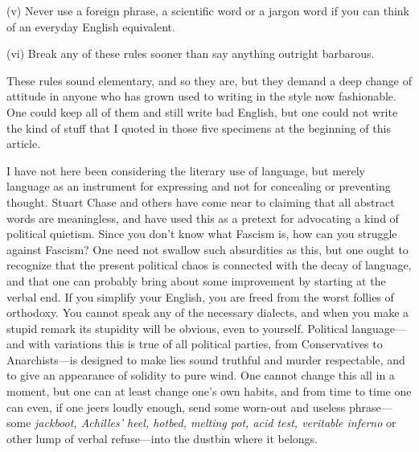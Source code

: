 (v) Never use a foreign phrase, a scientific word or a jargon word if
you can think of an everyday English equivalent.

(vi) Break any of these rules sooner than say anything outright
barbarous.

\noindent These rules sound elementary, and so they are, but they
demand a deep change of attitude in anyone who has grown used to
writing in the style now fashionable. One could keep all of them and
still write bad English, but one could not write the kind of stuff
that I quoted in those five specimens at the beginning of this
article.

I have not here been considering the literary use of
language, but merely language as an instrument for expressing and not
for concealing or preventing thought. Stuart Chase and others have
come near to claiming that all abstract words are meaningless, and
have used this as a pretext for advocating a kind of political
quietism. Since you don't know what Fascism is, how can you struggle
against Fascism? One need not swallow such absurdities as this, but
one ought to recognize that the present political chaos is connected
with the decay of language, and that one can probably bring about some
improvement by starting at the verbal end. If you simplify your
English, you are freed from the worst follies of orthodoxy. You cannot
speak any of the necessary dialects, and when you make a stupid remark
its stupidity will be obvious, even to yourself. Political
language---and with variations this is true of all political parties,
from Conservatives to Anarchists---is designed to make lies sound
truthful and murder respectable, and to give an appearance of solidity
to pure wind. One cannot change this all in a moment, but one can at
least change one's own habits, and from time to time one can even, if
one jeers loudly enough, send some worn-out and useless phrase---some
\textit{jackboot, Achilles' heel, hotbed, melting pot, acid test,
veritable inferno} or other lump of verbal refuse---into the dustbin
where it belongs.

